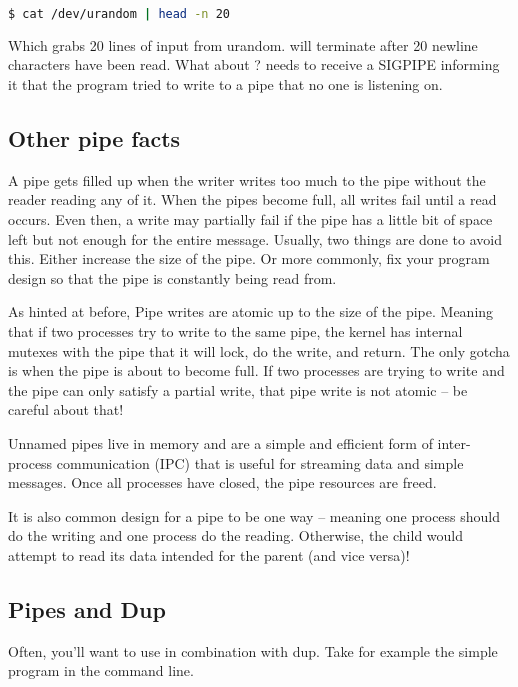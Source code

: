 	\begin{lstlisting}[language=bash]
	$ cat /dev/urandom | head -n 20
	\end{lstlisting}
	Which grabs 20 lines of input from urandom.  will terminate after 20 newline characters have been read.
	What about ?
	 needs to receive a SIGPIPE informing it that the program tried to write to a pipe that no one is listening on.
	 
	\subsection{Other pipe facts}
	 
	A pipe gets filled up when the writer writes too much to the pipe without the reader reading any of it. When the pipes become full, all writes fail until a read occurs. Even then, a write may partially fail if the pipe has a little bit of space left but not enough for the entire message. Usually, two things are done to avoid this. Either increase the size of the pipe. Or more commonly, fix your program design so that the pipe is constantly being read from.
	 
	As hinted at before, Pipe writes are atomic up to the size of the pipe. Meaning that if two processes try to write to the same pipe, the kernel has internal mutexes with the pipe that it will lock, do the write, and return. The only gotcha is when the pipe is about to become full. If two processes are trying to write and the pipe can only satisfy a partial write, that pipe write is not atomic -- be careful about that!
	 
	Unnamed pipes live in memory and are a simple and efficient form of inter-process communication (IPC) that is useful for streaming data and simple messages. Once all processes have closed, the pipe resources are freed.
	 
	It is also common design for a pipe to be one way -- meaning one process should do the writing and one process do the reading. Otherwise, the child would attempt to read its data intended for the parent (and vice versa)!
	 
	\subsection{Pipes and Dup}
	 
	Often, you'll want to use  in combination with dup.
	Take for example the simple program in the command line.
	 
